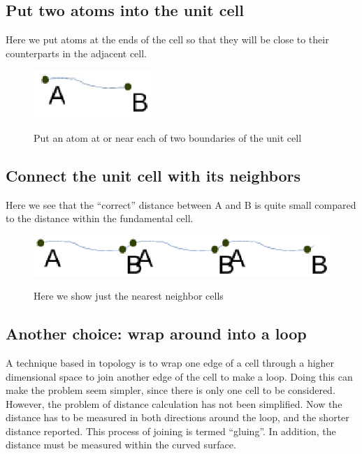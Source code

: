 \documentclass[preprint]{iucr}              %
\numberwithin{equation}{section}
\begin{document}
\subsection{Put two atoms into the unit cell}
	
	Here we put atoms at the ends of the cell so that they
	will be close to their counterparts in the adjacent cell.
\begin{figure}
	\includegraphics[width=0.4\textwidth]{line_2a}
	\label{line_2}
	\caption{Put an atom at or near each of two boundaries of the unit cell}
\end{figure}

\subsection{Connect the unit cell with its neighbors}
	
	Here we see that the ``correct'' distance between A and B is
	quite small compared to the distance within the 
	fundamental cell.
\begin{figure}
	\includegraphics[width=\textwidth]{line_3}
	\label{line_3}
	\caption{Here we show just the nearest neighbor cells}
\end{figure}

\subsection{Another choice: wrap around into a loop}
	A technique based in topology is to wrap one edge of a
	cell through a higher dimensional space to join
	another edge of the cell to make a loop. Doing this can make the 
	problem seem simpler, since there is only one cell
	to be considered. However, the problem of distance calculation has
	not been simplified. Now the distance has to be measured
	in both directions around the loop, and the shorter distance
	reported. This process of joining is termed ``gluing''. In
	addition, the distance must be measured within the curved
	surface.
	
\end{document}
